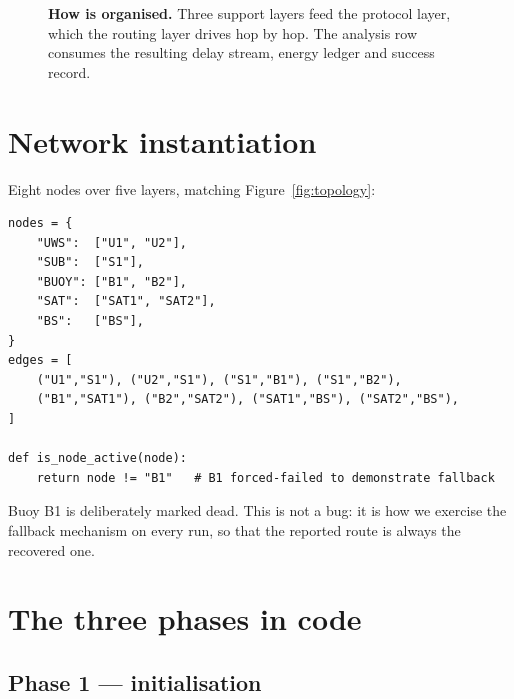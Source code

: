 \begin{figure}[H]
{}
\caption[Simulator architecture]{\textbf{How  is organised.} Three
support layers feed the protocol layer, which the routing layer drives hop by hop. The
analysis row consumes the resulting delay stream, energy ledger and success record.}
\label{fig:arch}
\end{figure}

\section{Network instantiation}

Eight nodes over five layers, matching Figure~\ref{fig:topology}:

\begin{lstlisting}[style=py,caption={Topology definition (lines 30--43).}]
nodes = {
    "UWS":  ["U1", "U2"],
    "SUB":  ["S1"],
    "BUOY": ["B1", "B2"],
    "SAT":  ["SAT1", "SAT2"],
    "BS":   ["BS"],
}
edges = [
    ("U1","S1"), ("U2","S1"), ("S1","B1"), ("S1","B2"),
    ("B1","SAT1"), ("B2","SAT2"), ("SAT1","BS"), ("SAT2","BS"),
]

def is_node_active(node):
    return node != "B1"   # B1 forced-failed to demonstrate fallback
\end{lstlisting}

Buoy B1 is deliberately marked dead. This is not a bug: it is how we exercise the fallback
mechanism on every run, so that the reported route is always the recovered one.

\section{The three phases in code}

\subsection{Phase 1 --- initialisation}

